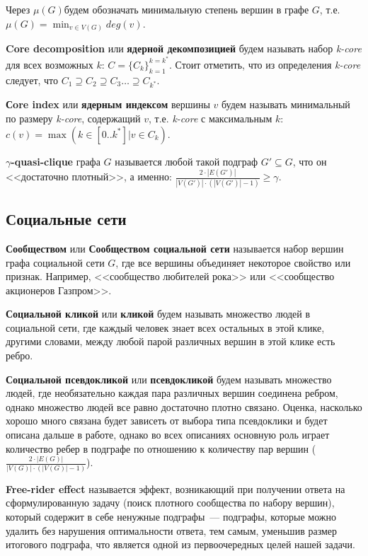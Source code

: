 Через \boldmath$\mu(G)$\unboldmath будем обозначать минимальную степень вершин в графе $G$, т.е. $\mu(G) = \min_{v \in V(G)} deg(v)$.

\textbf{Core decomposition} или \textbf{ядерной декомпозицией} будем называть набор \textit{k-core} для всех возможных $k$: $C = \{C_k\}_{k=1}^{k=k^*}$. Стоит отметить, что из определения \textit{k-core} следует, что $C_1 \supseteq C_2 \supseteq C_3 \ldots \supseteq C_{k^*}$.

\textbf{Сore index} или \textbf{ядерным индексом} вершины $v$ будем называть минимальный по размеру \textit{k-core}, содержащий $v$, т.е. \textit{k-core} с максимальным $k$: $c(v) = \max(k \in [0..k^*] | v \in C_k)$.

\textbf{$\gamma$-quasi-clique} графа $G$ называется любой такой подграф $G' \subseteq G$, что он <<достаточно плотный>>, а именно: $\frac{2 \cdot |E(G')|}{|V(G')| \cdot (|V(G')| - 1)} \ge \gamma$.

\subsection{Социальные сети}

\textbf{Сообществом} или \textbf{Сообществом социальной сети} называется набор вершин графа социальной сети $G$, где все вершины объединяет некоторое свойство или признак. Например, <<сообщество любителей рока>> или <<сообщество акционеров Газпром>>.

\textbf{Социальной кликой} или \textbf{кликой} будем называть множество людей в социальной сети, где каждый человек знает всех остальных в этой клике, другими словами, между любой парой различных вершин в этой клике есть ребро.

\textbf{Социальной псевдокликой} или \textbf{псевдокликой} будем называть множество людей, где необязательно каждая пара различных вершин соединена ребром, однако множество людей все равно достаточно плотно связано. Оценка, насколько хорошо много связана будет зависеть от выбора типа псевдоклики и будет описана дальше в работе, однако во всех описаниях основную роль играет количество ребер в подграфе по отношению к количеству пар вершин ($\frac{2 \cdot |E(G)|}{|V(G)| \cdot (|V(G)| - 1)}$).

\textbf{Free-rider effect} называется эффект, возникающий при получении ответа на сформулированную задачу (поиск плотного сообщества по набору вершин), который содержит в себе ненужные подграфы~--- подграфы, которые можно удалить без нарушения оптимальности ответа, тем самым, уменьшив размер итогового подграфа, что является одной из первоочередных целей нашей задачи.

